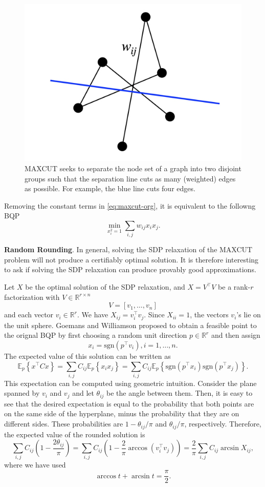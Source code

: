 \documentclass[
]{book}
\theoremstyle{definition}
\theoremstyle{definition}
\theoremstyle{definition}
\theoremstyle{definition}
\theoremstyle{remark}
\begin{document}
\begin{figure}

{\centering \includegraphics[width=0.6\linewidth]{images/max_cut} 

}

\caption{MAXCUT seeks to separate the node set of a graph into two disjoint groups such that the separation line cuts as many (weighted) edges as possible. For example, the blue line cuts four edges.}\label{fig:MAXCUT}
\end{figure}

Removing the constant terms in \eqref{eq:maxcut-org}, it is equivalent to the followng BQP
\begin{equation}
\min_{x_i^2 = 1}  \sum_{i,j} w_{ij} x_i x_j.
\label{eq:maxcut-bqp}
\end{equation}

\textbf{Random Rounding}. In general, solving the SDP relaxation of the MAXCUT problem will not produce a certifiably optimal solution. It is therefore interesting to ask if solving the SDP relaxation can produce provably good approximations.

Let \(X\) be the optimal solution of the SDP relaxation, and \(X = V^\top V\) be a rank-\(r\) factorization with \(V \in \mathbb{R}^{r \times n}\)
\[
V = [v_1,\dots,v_n]
\]
and each vector \(v_i \in \mathbb{R}^{r}\). We have \(X_{ij} = v_i^\top v_j\). Since \(X_{ii} = 1\), the vectors \(v_i\)'s lie on the unit sphere. Goemans and Williamson \citep{goemans95jacm-improved} proposed to obtain a feasible point to the orignal BQP by first choosing a random unit direction \(p \in \mathbb{R}^{r}\) and then assign
\[
x_i = \mathrm{sgn}(p^\top v_i), i=1,\dots,n.
\]
The expected value of this solution can be written as
\[
\mathbb{E}_p  \left\{ x^\top C x \right\}  = \sum_{i,j} C_{ij} \mathbb{E}_p  \left\{ x_i x_j \right\}  = \sum_{i,j} C_{ij} \mathbb{E}_p  \left\{ \mathrm{sgn}(p^\top x_i) \mathrm{sgn}(p^\top x_j) \right\} .
\]
This expectation can be computed using geometric intuition. Consider the plane spanned by \(v_i\) and \(v_j\) and let \(\theta_{ij}\) be the angle between them. Then, it is easy to see that the desired expectation is equal to the probability that both points are on the same side of the hyperplane, minus the probability that they are on different sides. These probabilities are \(1- \theta_{ij} / \pi\) and \(\theta_{ij} / \pi\), respectively. Therefore, the expected value of the rounded solution is
\[
\sum_{i,j} C_{ij} \left( 1- \frac{2\theta_{ij}}{\pi} \right) = \sum_{i,j} C_{ij} \left( 1- \frac{2}{\pi} \arccos (v_i^\top v_j)  \right) = \frac{2}{\pi} \sum_{i,j} C_{ij} \arcsin X_{ij},
\]
where we have used
\[
\arccos t + \arcsin t = \frac{\pi}{2}.
\]
\end{document}
